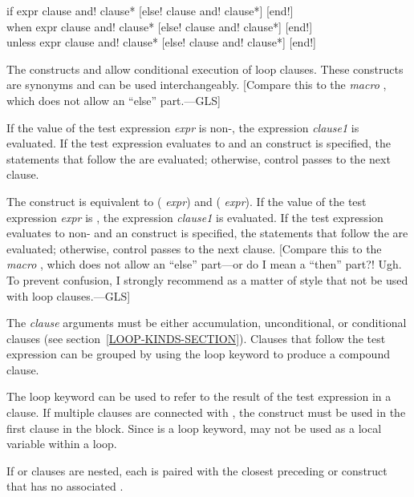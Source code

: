 \begin{defloop}
if expr clause {\!and! clause}*
   [\!else! clause {\!and! clause}*] [\!end!] \\
when expr clause {\!and! clause}*
     [\!else! clause {\!and! clause}*] [\!end!] \\
unless expr clause {\!and! clause}*
       [\!else! clause {\!and! clause}*] [\!end!]

The constructs  and  allow conditional execution of
loop clauses.  These constructs are synonyms and
can be used interchangeably.  [Compare this to the {\it macro} ,
which does not allow an ``else'' part.---GLS]

If the value of the test expression {\it expr\/} is non-, the expression
{\it clause1\/} is evaluated. If the test expression evaluates to 
and an  construct is specified, the statements that follow the
 are evaluated; otherwise, control passes to the next clause.

The  construct is equivalent to  ( 
{\it expr\/}) and  ( {\it expr\/}).
If the value of the test expression {\it expr\/} is , the expression
{\it clause1\/} is evaluated. If the test expression evaluates to 
non-
and an  construct is specified, the statements that follow the
 are evaluated; otherwise, control passes to the next clause.
[Compare this to the {\it macro} ,
which does not allow an ``else'' part---or do I mean a ``then'' part?!  Ugh.
To prevent confusion, I strongly recommend as a matter of style
that  not be used with  loop clauses.---GLS]

The {\it clause\/} arguments must be either accumulation, unconditional,
or conditional clauses (see section~\ref{LOOP-KINDS-SECTION}).
Clauses that follow the test expression can be grouped by using the 
loop keyword  to produce a compound 
clause.

The loop keyword  can be used to refer to the result of
the test expression in a clause.  If multiple clauses are connected with ,
the  construct must be used in the first
clause in the block.  Since  is a loop keyword,  may not be used
as a local variable within a loop.

If  or  clauses are nested, each  is
paired with the closest preceding  or  construct that has
no associated .


\end{defloop}
